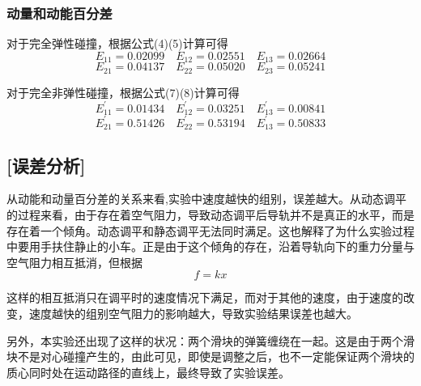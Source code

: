 \documentclass[UTF8]{article}
\begin{document}
	\subsubsection*{动量和动能百分差}
	\par 对于完全弹性碰撞，根据公式(4)(5)计算可得
	\[E_{11}=0.02099\quad E_{12}=0.02551 \quad E_{13}=0.02664\]
	\[E_{21}=0.04137\quad E_{22}=0.05020 \quad E_{23}=0.05241\]
	\par 对于完全非弹性碰撞，根据公式(7)(8)计算可得
	\[E_{11}^{'}=0.01434 \quad E_{12}^{'}=0.03251 \quad E_{13}^{'}=0.00841\]
	\[E_{21}^{'}=0.51426 \quad E_{22}^{'}=0.53194 \quad E_{13}^{'}=0.50833\]
	\subsection*{[误差分析]}
	\par 从动能和动量百分差的关系来看,实验中速度越快的组别，误差越大。从动态调平的过程来看，由于存在着空气阻力，导致动态调平后导轨并不是真正的水平，而是存在着一个倾角。动态调平和静态调平无法同时满足。这也解释了为什么实验过程中要用手扶住静止的小车。正是由于这个倾角的存在，沿着导轨向下的重力分量与空气阻力相互抵消，但根据
	\[f=kx\]
	\par 这样的相互抵消只在调平时的速度情况下满足，而对于其他的速度，由于速度的改变，速度越快的组别空气阻力的影响越大，导致实验结果误差也越大。
	\par
	\par 另外，本实验还出现了这样的状况：两个滑块的弹簧缠绕在一起。这是由于两个滑块不是对心碰撞产生的，由此可见，即使是调整之后，也不一定能保证两个滑块的质心同时处在运动路径的直线上，最终导致了实验误差。
\end{document}
